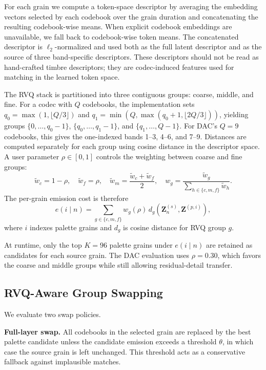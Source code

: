 \documentclass[twoside,a4paper]{article}
\begin{document}
For each grain we compute a token-space descriptor by averaging the embedding vectors selected by each codebook over the grain duration and concatenating the resulting codebook-wise means. When explicit codebook embeddings are unavailable, we fall back to codebook-wise token means. The concatenated descriptor is $\ell_2$-normalized and used both as the full latent descriptor and as the source of three band-specific descriptors. These descriptors should not be read as hand-crafted timbre descriptors; they are codec-induced features used for matching in the learned token space.

The RVQ stack is partitioned into three contiguous groups: coarse, middle, and fine. For a codec with $Q$ codebooks, the implementation sets $q_0=\max(1,\lfloor Q/3\rfloor)$ and $q_1=\min(Q,\max(q_0+1,\lfloor 2Q/3\rfloor))$, yielding groups $\{0,\ldots,q_0-1\}$, $\{q_0,\ldots,q_1-1\}$, and $\{q_1,\ldots,Q-1\}$. For DAC's $Q=9$ codebooks, this gives the one-indexed bands 1--3, 4--6, and 7--9. Distances are computed separately for each group using cosine distance in the descriptor space. A user parameter $\rho \in [0,1]$ controls the weighting between coarse and fine groups:
\begin{equation}
\tilde{w}_c = 1-\rho,\quad \tilde{w}_f = \rho,\quad \tilde{w}_m = \frac{\tilde{w}_c+\tilde{w}_f}{2},\quad
w_g = \frac{\tilde{w}_g}{\sum_{h\in\{c,m,f\}}\tilde{w}_h}.
\end{equation}
The per-grain emission cost is therefore
\begin{equation}
e(i \mid n) = \sum_{g \in \{c,m,f\}} w_g(\rho)\, d_g\!\left(\mathbf{Z}^{(s)}_n,\mathbf{Z}^{(p,i)}\right),
\end{equation}
where $i$ indexes palette grains and $d_g$ is cosine distance for RVQ group $g$.

At runtime, only the top $K=96$ palette grains under $e(i \mid n)$ are retained as candidates for each source grain. The DAC evaluation uses $\rho=0.30$, which favors the coarse and middle groups while still allowing residual-detail transfer.

\subsection{RVQ-Aware Group Swapping}

We evaluate two swap policies.

\noindent \textbf{Full-layer swap.} All codebooks in the selected grain are replaced by the best palette candidate unless the candidate emission exceeds a threshold $\theta$, in which case the source grain is left unchanged. This threshold acts as a conservative fallback against implausible matches.
\end{document}
